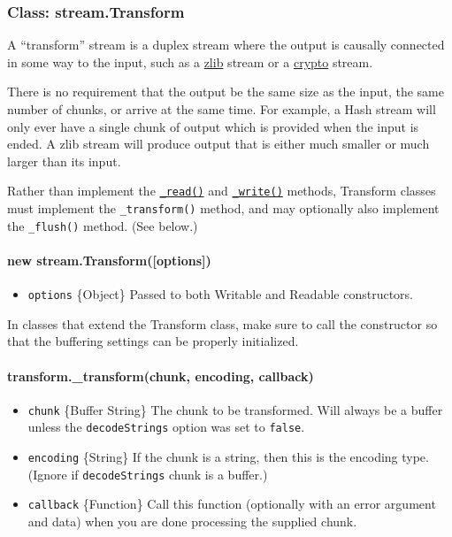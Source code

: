 \subsubsection{Class: stream.Transform}\label{class-stream.transform-1}

A ``transform'' stream is a duplex stream where the output is causally
connected in some way to the input, such as a \href{zlib.html}{zlib}
stream or a \href{crypto.html}{crypto} stream.

There is no requirement that the output be the same size as the input,
the same number of chunks, or arrive at the same time. For example, a
Hash stream will only ever have a single chunk of output which is
provided when the input is ended. A zlib stream will produce output that
is either much smaller or much larger than its input.

Rather than implement the
\hyperref[streamux5freadableux5freadux5fsizeux5f1]{\texttt{\_read()}}
and
\hyperref[streamux5fwritableux5fwriteux5fchunkux5fencodingux5fcallbackux5f1]{\texttt{\_write()}}
methods, Transform classes must implement the \texttt{\_transform()}
method, and may optionally also implement the \texttt{\_flush()} method.
(See below.)

\paragraph{new
stream.Transform({[}options{]})}\label{new-stream.transformoptions}

\begin{itemize}
\itemsep1pt\parskip0pt
\item
  \texttt{options} \{Object\} Passed to both Writable and Readable
  constructors.
\end{itemize}

In classes that extend the Transform class, make sure to call the
constructor so that the buffering settings can be properly initialized.

\paragraph{transform.\_transform(chunk, encoding,
callback)}\label{transform.ux5ftransformchunk-encoding-callback}

\begin{itemize}
\itemsep1pt\parskip0pt
\item
  \texttt{chunk} \{Buffer \textbar{} String\} The chunk to be
  transformed. Will always be a buffer unless the \texttt{decodeStrings}
  option was set to \texttt{false}.
\item
  \texttt{encoding} \{String\} If the chunk is a string, then this is
  the encoding type. (Ignore if \texttt{decodeStrings} chunk is a
  buffer.)
\item
  \texttt{callback} \{Function\} Call this function (optionally with an
  error argument and data) when you are done processing the supplied
  chunk.
\end{itemize}

